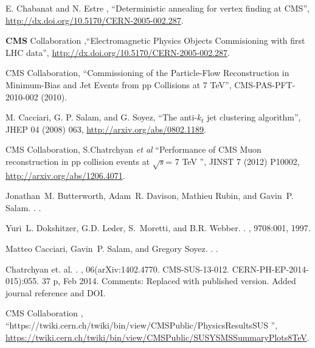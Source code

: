 \begin{thebibliography}{99}
 E. Chabanat and N. Estre , ``Deterministic annealing for vertex finding at CMS'', \url{http://dx.doi.org/10.5170/CERN-2005-002.287}.


 {\bf CMS} Collaboration ,``Electromagnetic Physics Objects Commisioning with first LHC data'', \url{http://dx.doi.org/10.5170/CERN-2005-002.287}.


 CMS Collaboration, ``Commissioning of the Particle-Flow Reconstruction in
Minimum-Bias and Jet Events from pp Collisions at 7 TeV'', CMS-PAS-PFT-2010-002 (2010).


 M. Cacciari, G. P. Salam, and G. Soyez, ``The anti-$k_t$ jet clustering algorithm'', JHEP 04
(2008) 063, \url{http://arxiv.org/abs/0802.1189}.

 CMS Collaboration, S.Chatrchyan {\it et al} ``Performance of CMS Muon reconstruction in pp collision events at $\sqrt{s}$= 7 TeV '', JINST 7 (2012) P10002, \url{http://arxiv.org/abs/1206.4071}.



Jonathan~M. Butterworth, Adam~R. Davison, Mathieu Rubin, and Gavin~P. Salam.
.
.


Yuri~L. Dokshitzer, G.D. Leder, S.~Moretti, and B.R. Webber.
.
, 9708:001, 1997.



Matteo Cacciari, Gavin~P. Salam, and Gregory Soyez.
.
.




Chatrchyan {\rm et. al}.
.
, 06(arXiv:1402.4770. CMS-SUS-13-012.
  CERN-PH-EP-2014-015):055. 37 p, Feb 2014.
\newblock Comments: Replaced with published version. Added journal reference
  and DOI.





 CMS Collaboration , ``https://twiki.cern.ch/twiki/bin/view/CMSPublic/PhysicsResultsSUS '', \url{https://twiki.cern.ch/twiki/bin/view/CMSPublic/SUSYSMSSummaryPlots8TeV}.






\end{thebibliography}
